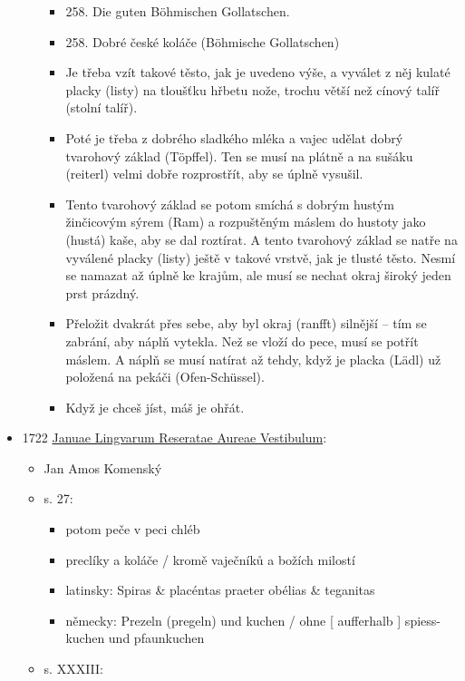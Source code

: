 \begin{itemize}
\begin{itemize}
    \begin{itemize}
    \tightlist
    \item
      258. Die guten Böhmischen Gollatschen.
    \item
      258. Dobré české koláče (Böhmische Gollatschen)
    \item
      Je třeba vzít takové těsto, jak je uvedeno výše, a vyválet z něj
      kulaté placky (listy) na tloušťku hřbetu nože, trochu větší než
      cínový talíř (stolní talíř).
    \item
      Poté je třeba z dobrého sladkého mléka a vajec udělat dobrý
      tvarohový základ (Töpffel). Ten se musí na plátně a na sušáku
      (reiterl) velmi dobře rozprostřít, aby se úplně vysušil.
    \item
      Tento tvarohový základ se potom smíchá s dobrým hustým žinčicovým
      sýrem (Ram) a rozpuštěným máslem do hustoty jako (hustá) kaše, aby
      se dal roztírat. A tento tvarohový základ se natře na vyválené
      placky (listy) ještě v takové vrstvě, jak je tlusté těsto. Nesmí
      se namazat až úplně ke krajům, ale musí se nechat okraj široký
      jeden prst prázdný.
    \item
      Přeložit dvakrát přes sebe, aby byl okraj (ranfft) silnější -- tím
      se zabrání, aby náplň vytekla. Než se vloží do pece, musí se
      potřít máslem. A náplň se musí natírat až tehdy, když je placka
      (Lädl) už položená na pekáči (Ofen-Schüssel).
    \item
      Když je chceš jíst, máš je ohřát.
    \end{itemize}
  \end{itemize}
\item
  1722
  \href{https://ceskadigitalniknihovna.cz/uuid/uuid:53e484e8-3646-4b98-a954-6abfe5313ce0}{Januae
  Lingvarum Reseratae Aureae Vestibulum}:

  \begin{itemize}
  \tightlist
  \item
    Jan Amos Komenský
  \item
    s. 27:

    \begin{itemize}
    \tightlist
    \item
      potom peče v peci chléb
    \item
      preclíky a koláče / kromě vaječníků a božích milostí
    \item
      latinsky: Spiras \& placéntas praeter obélias \& teganitas
    \item
      německy: Prezeln (pregeln) und kuchen / ohne {[} aufferhalb {]}
      spiess-kuchen und pfaunkuchen
    \end{itemize}
  \item
    s. XXXIII:


\end{itemize}
\end{itemize}
